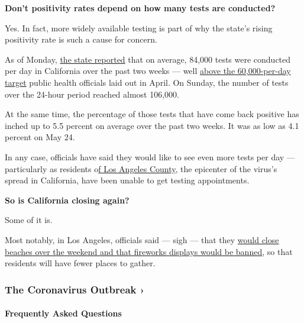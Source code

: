 \textbf{Don't positivity rates depend on how many tests are conducted?}

Yes. In fact, more widely available testing is part of why the state's
rising positivity rate is such a cause for concern.

As of Monday, \href{https://update.covid19.ca.gov/}{the state reported}
that on average, 84,000 tests were conducted per day in California over
the past two weeks --- well
\href{https://www.nytimes3xbfgragh.onion/2020/04/24/us/coronavirus-covid-get-antibody-testing.html}{above
the 60,000-per-day target} public health officials laid out in April. On
Sunday, the number of tests over the 24-hour period reached almost
106,000.

At the same time, the percentage of those tests that have come back
positive has inched up to 5.5 percent on average over the past two
weeks. It was as low as 4.1 percent on May 24.

In any case, officials have said they would like to see even more tests
per day --- particularly as residents
o\href{https://www.latimes.com/california/story/2020-06-24/why-is-it-still-so-hard-to-get-a-coronavirus-test}{f
Los Angeles County}, the epicenter of the virus's spread in California,
have been unable to get testing appointments.

\textbf{So is California closing again?}

Some of it is.

Most notably, in Los Angeles, officials said --- sigh --- that they
\href{https://twitter.com/lapublichealth/status/1277758362097037313}{would
close beaches over the weekend and that fireworks displays would be
banned}, so that residents will have fewer places to gather.

\href{https://www.nytimes3xbfgragh.onion/news-event/coronavirus?action=click\&pgtype=Article\&state=default\&region=MAIN_CONTENT_3\&context=storylines_faq}{}

\hypertarget{the-coronavirus-outbreak-}{%
\subsubsection{The Coronavirus Outbreak
›}\label{the-coronavirus-outbreak-}}

\hypertarget{frequently-asked-questions}{%
\paragraph{Frequently Asked
Questions}\label{frequently-asked-questions}}

